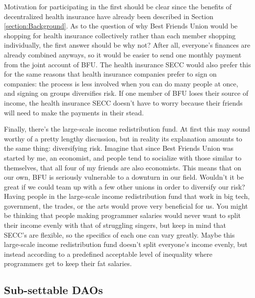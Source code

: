 \documentclass{article}[10pt]
\begin{document}
Motivation for participating in the first should be clear since the benefits of decentralized health insurance have already been described in Section \ref{section:Background}.
As to the question of why Best Friends Union would be shopping for health insurance collectively rather than each member shopping individually, the first answer should be why not?
After all, everyone's finances are already combined anyways, so it would be easier to send one monthly payment from the joint account of BFU.
The health insurance SECC would also prefer this for the same reasons that health insurance companies prefer to sign on companies: the process is less involved when you can do many people at once, and signing on groups diversifies risk.
If one member of BFU loses their source of income, the health insurance SECC doesn't have to worry because their friends will need to make the payments in their stead. \par

Finally, there's the large-scale income redistribution fund.
At first this may sound worthy of a pretty lengthy discussion, but in reality its explanation amounts to the same thing: diversifying risk.
Imagine that since Best Friends Union was started by me, an economist, and people tend to socialize with those similar to themselves, that all four of my friends are also economists.
This means that on our own, BFU is seriously vulnerable to a downturn in our field.
Wouldn't it be great if we could team up with a few other unions in order to diversify our risk?
Having people in the large-scale income redistribution fund that work in big tech, government, the trades, or the arts would prove very beneficial for us.
You might be thinking that people making programmer salaries would never want to split their income evenly with that of struggling singers, but keep in mind that SECC's are flexible, so the specifics of each one can vary greatly.
Maybe this large-scale income redistribution fund doesn't split everyone's income evenly, but instead according to a predefined acceptable level of inequality where programmers get to keep their fat salaries.\par




\subsection{Sub-settable DAOs}
\label{subsection:subset}
\end{document}
